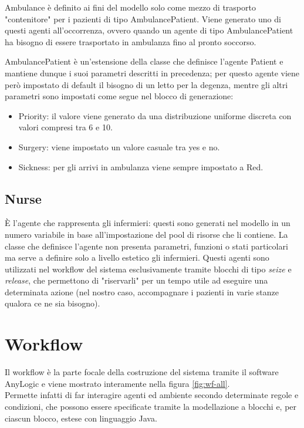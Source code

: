 Ambulance è definito ai fini del modello solo come mezzo di trasporto "contenitore" per i pazienti di tipo AmbulancePatient.
Viene generato uno di questi agenti all'occorrenza, ovvero quando un agente di tipo AmbulancePatient ha bisogno di essere trasportato in ambulanza fino al pronto soccorso. 

AmbulancePatient è un'estensione della classe che definisce l'agente Patient e mantiene dunque i suoi parametri descritti in precedenza; per questo agente viene però impostato di default il bisogno di un letto per la degenza, mentre gli altri parametri sono impostati come segue nel blocco di generazione: 
\begin{itemize}
    \item Priority: il valore viene generato da una distribuzione uniforme discreta con valori compresi tra 6 e 10. 
    \item Surgery: viene impostato un valore casuale tra yes e no. 
    \item Sickness: per gli arrivi in ambulanza viene sempre impostato a Red. 
\end{itemize}

\subsection{Nurse}
È l'agente che rappresenta gli infermieri: questi sono generati nel modello in un numero variabile in base all'impostazione del pool di risorse che li contiene. 
La classe che definisce l'agente non presenta parametri, funzioni o stati particolari ma serve a definire solo a livello estetico gli infermieri. 
Questi agenti sono utilizzati nel workflow del sistema esclusivamente tramite blocchi di tipo \textit{seize} e \textit{release}, che permettono di "riservarli" per un tempo utile ad eseguire una determinata azione (nel nostro caso, accompagnare i pazienti in varie stanze qualora ce ne sia bisogno). 

\section{Workflow}

Il workflow è la parte focale della costruzione del sistema tramite il software AnyLogic e viene mostrato interamente nella figura \ref{fig:wf-all}.
\\Permette infatti di far interagire agenti ed ambiente secondo determinate regole e condizioni, che possono essere specificate tramite la modellazione a blocchi e, per ciascun blocco, estese con linguaggio Java. 


